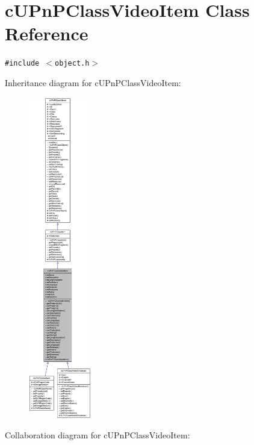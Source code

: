 \hypertarget{classcUPnPClassVideoItem}{
\section{cUPnPClassVideoItem Class Reference}
\label{classcUPnPClassVideoItem}
}
{\tt \#include $<$object.h$>$}

Inheritance diagram for cUPnPClassVideoItem:\nopagebreak
\begin{figure}[H]
\begin{center}
\leavevmode
\includegraphics[height=400pt]{classcUPnPClassVideoItem__inherit__graph}
\end{center}
\end{figure}
Collaboration diagram for cUPnPClassVideoItem:\nopagebreak
